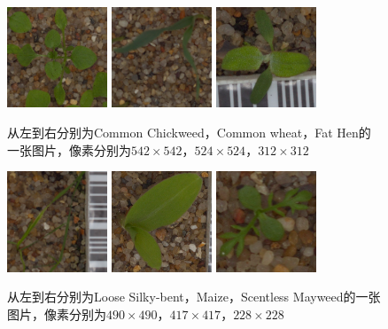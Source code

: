 \begin{figure}[htbp]
\centering
\includegraphics[width=30mm,height=30mm]{../figures/Common_Chickweed_0a1c68ef9.png} 	
\includegraphics[width=30mm,height=30mm]{../figures/Common_wheat_6dfb9a152.png} 	
\includegraphics[width=30mm,height=30mm]{../figures/Fat_Hen_0eeb0c7c1.png}	
\caption{从左到右分别为Common Chickweed，Common wheat，Fat Hen的一张图片，像素分别为$542\times542$，$524\times524$，$312\times312$}
\label{fig:myl2}
\end{figure}

\begin{figure}[htbp]
\centering
\includegraphics[width=30mm,height=30mm]{../figures/Loose_Silky-bent_3cac767c2.png} 	
\includegraphics[width=30mm,height=30mm]{../figures/Maize_1d21b25f9.png}	
\includegraphics[width=30mm,height=30mm]{../figures/Scentless_Mayweed_0ae9acf83.png}
\caption{从左到右分别为Loose Silky-bent，Maize，Scentless Mayweed的一张图片，像素分别为$490\times490$，$417\times417$，$228\times228$}
\label{fig:myl3}
\end{figure}

